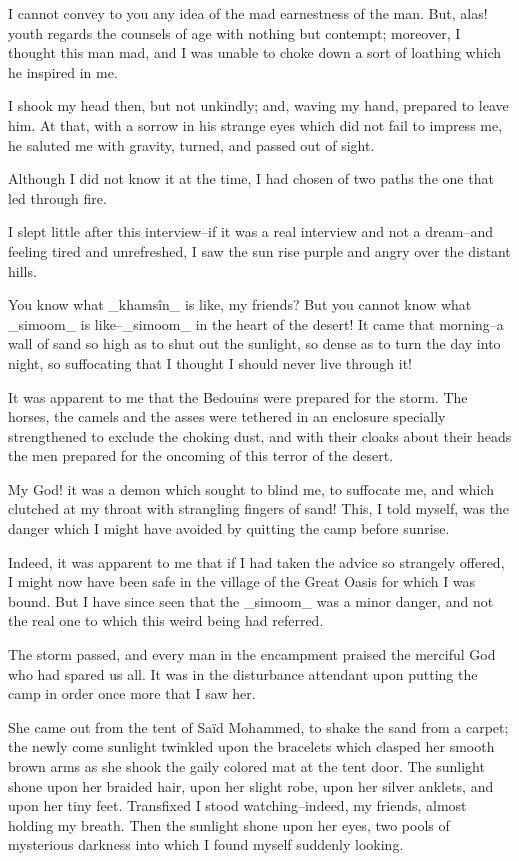 I cannot convey to you any idea of the mad earnestness of the man.
But, alas! youth regards the counsels of age with nothing but
contempt; moreover, I thought this man mad, and I was unable to choke
down a sort of loathing which he inspired in me.

I shook my head then, but not unkindly; and, waving my hand, prepared
to leave him. At that, with a sorrow in his strange eyes which did not
fail to impress me, he saluted me with gravity, turned, and passed out
of sight.

Although I did not know it at the time, I had chosen of two paths the
one that led through fire.

I slept little after this interview--if it was a real interview and
not a dream--and feeling tired and unrefreshed, I saw the sun rise
purple and angry over the distant hills.

You know what _khamsîn_ is like, my friends? But you cannot know what
_simoom_ is like--_simoom_ in the heart of the desert! It came that
morning--a wall of sand so high as to shut out the sunlight, so dense
as to turn the day into night, so suffocating that I thought I should
never live through it!

It was apparent to me that the Bedouins were prepared for the storm.
The horses, the camels and the asses were tethered in an enclosure
specially strengthened to exclude the choking dust, and with their
cloaks about their heads the men prepared for the oncoming of this
terror of the desert.

My God! it was a demon which sought to blind me, to suffocate me,
and which clutched at my throat with strangling fingers of sand! This,
I told myself, was the danger which I might have avoided by quitting
the camp before sunrise.

Indeed, it was apparent to me that if I had taken the advice so
strangely offered, I might now have been safe in the village of the
Great Oasis for which I was bound. But I have since seen that the
_simoom_ was a minor danger, and not the real one to which this weird
being had referred.

The storm passed, and every man in the encampment praised the merciful
God who had spared us all. It was in the disturbance attendant upon
putting the camp in order once more that I saw her.

She came out from the tent of Saïd Mohammed, to shake the sand from
a carpet; the newly come sunlight twinkled upon the bracelets which
clasped her smooth brown arms as she shook the gaily colored mat at
the tent door. The sunlight shone upon her braided hair, upon her
slight robe, upon her silver anklets, and upon her tiny feet.
Transfixed I stood watching--indeed, my friends, almost holding my
breath. Then the sunlight shone upon her eyes, two pools of mysterious
darkness into which I found myself suddenly looking.

